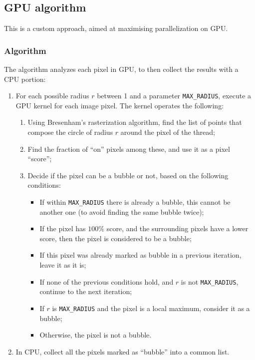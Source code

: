 \subsection{GPU algorithm}

This is a custom approach, aimed at maximising parallelization on GPU.

\subsubsection{Algorithm}

The algorithm analyzes each pixel in GPU, to then collect the results with a CPU portion:
\begin{enumerate}
	\itemsep 0em
	\item For each possible radius $r$ between 1 and a parameter \texttt{MAX\_RADIUS}, execute a GPU kernel for each image pixel. The kernel operates the following:
	      \begin{enumerate}
		      \item Using Bresenham's rasterization algorithm, find the list of points that compose the circle of radius $r$ around the pixel of the thread;
		      \item Find the fraction of ``on'' pixels among these, and use it as a pixel ``score'';
		      \item Decide if the pixel can be a bubble or not, based on the following conditions:
		            \begin{itemize}
			            \item If within \texttt{MAX\_RADIUS} there is already a bubble, this cannot be another one (to avoid finding the same bubble twice);
			            \item If the pixel has $100\%$ score, and the surrounding pixels have a lower score, then the pixel is considered to be a bubble;
			            \item If this pixel was already marked as bubble in a previous iteration, leave it as it is;
			            \item If none of the previous conditions hold, and $r$ is not \texttt{MAX\_RADIUS}, continue to the next iteration;
			            \item If $r$ is \texttt{MAX\_RADIUS} and the pixel is a local maximum, consider it as a bubble;
			            \item Otherwise, the pixel is not a bubble.
		            \end{itemize}
	      \end{enumerate}
	\item In CPU, collect all the pixels marked as ``bubble'' into a common list.
\end{enumerate}


